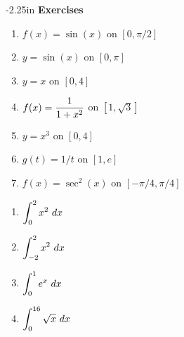 \begin{adjustwidth*}{}{-2.25in}
\textbf{{\large Exercises}}
\setlength{\columnsep}{25pt}
\begin{multicols*}{2}
 \small


\begin{enumerate}[1)]
\item $f(x)=\sin(x)$ on $[0,\pi/2]$
\item $y=\sin(x)$ on $[0,\pi]$
\item $y=x$ on $[0,4]$
\item $\displaystyle f(x) = \frac{1}{1+x^2}$ on $[1,\sqrt{3}]$
\item $y=x^3$ on $[0,4]$
\item $g(t) = 1/t$ on $[1,e]$
\item $f(x) = \sec^2(x)$ on $[-\pi/4, \pi/4]$
\end{enumerate}


\begin{enumerate}[1),resume]
\item $\displaystyle \int_0^2 x^2\ dx$
\item $\ds \int_{-2}^2 x^2\ dx$
\item $\ds \int_{0}^1 e^x\ dx$
\item $\ds \int_{0}^{16} \sqrt{x}\ dx$
\end{enumerate}



\end{multicols*}
\end{adjustwidth*}
